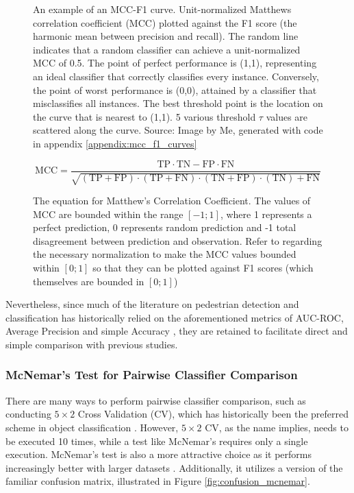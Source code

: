     \begin{figure}
        \centering
        
        \caption{An example of an MCC-F1 curve. Unit-normalized Matthews correlation coefficient (MCC) plotted against the F1 score (the harmonic mean between precision and recall). The random line indicates that a random classifier can achieve a unit-normalized MCC of 0.5. The point of perfect performance is (1,1), representing an ideal classifier that correctly classifies every instance. Conversely, the point of worst performance is (0,0), attained by a classifier that misclassifies all instances. The best threshold point is the location on the curve that is nearest to (1,1). 5 various threshold $\tau$ values are scattered along the curve. Source: Image by Me, generated with code in appendix \ref{appendix:mcc_f1_curves}}
        \label{fig:mcc_f1_example}
    \end{figure}


    \begin{figure}
        $$\mathrm{MCC} = \frac{\mathrm{TP}\cdot\mathrm{TN}-\mathrm{FP}\cdot\mathrm{FN}}{\sqrt{(\mathrm{TP}+\mathrm{FP})\cdot(\mathrm{TP}+\mathrm{FN})\cdot(\mathrm{TN}+\mathrm{FP})\cdot(\mathrm{TN})+\mathrm{FN}}}$$ 
        \caption{The equation for Matthew's Correlation Coefficient. The values of MCC are bounded within the range $[-1;1]$, where 1 represents a perfect prediction, 0 represents random prediction and -1 total disagreement between prediction and observation. Refer to \cite{chicco_jurman_2020_mcc_f1} regarding the necessary normalization to make the MCC values bounded within $[0;1]$ so that they can be plotted against F1 scores (which themselves are bounded in $[0;1]$)}
    \end{figure}

    Nevertheless, since much of the literature on pedestrian detection and classification has historically relied on the aforementioned metrics of AUC-ROC, Average Precision and simple Accuracy \cite{dalal_2005_histograms} \cite{dollar_2012_pedestrian}, they are retained to facilitate direct and simple comparison with previous studies.

    \subsubsection{McNemar's Test for Pairwise Classifier Comparison}

    There are many ways to perform pairwise classifier comparison, such as conducting $5 \times 2$ Cross Validation (CV), which has historically been the preferred scheme in object classification \cite{dietterich_1998_mcnemar}. However, $5 \times 2$ CV, as the name implies, needs to be executed 10 times, while a test like McNemar's requires only a single execution. McNemar's test is also a more attractive choice as it performs increasingly better with larger datasets \cite{raschka_2018_mcnemar}. Additionally, it utilizes a version of the familiar confusion matrix, illustrated in Figure \ref{fig:confusion_mcnemar}.

